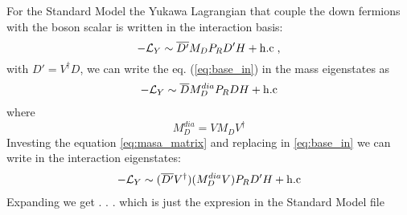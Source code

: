 \begin{frame}{}
For the Standard Model the Yukawa Lagrangian that couple the down fermions with the boson scalar is written in the interaction basis:
\begin{equation}\label{eq:base_in}
  \mathcal{-L}_Y\sim\overline{D'}M_D P_R D'H + {\rm h.c}\; ,
\end{equation}
with $D'=V^{\dagger}D$, we can write the eq. (\ref{eq:base_in}) in the mass eigenstates 
as
\begin{align}
  \mathcal{-L}_Y\sim\overline{D}M_D^{dia}P_RDH + {\rm h.c}
\end{align} 
where
\begin{equation}\label{eq:masa_matrix}
  M_D^{dia}=VM_DV^{\dagger}
\end{equation}
 Investing the equation \ref{eq:masa_matrix} and replacing in \eqref{eq:base_in}  we can write in the interaction eigenstates:
 \begin{align}
   \mathcal{-L}_Y\sim (\overline{D'}V^{\dagger})(M_D^{dia}V)P_R D'H + {\rm h.c}
 \end{align}
Expanding we get
. . .
which is just the expresion in the Standard Model file  



\end{frame}


